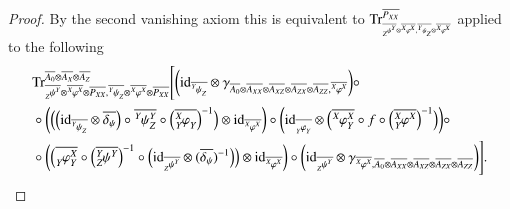 \documentclass{amsart}
\def\tn{\textnormal}
\def\Trace{\tn{Tr}}
\def\ol{\overline}
\def\id{\tn{id}}
\newcommand{\feeddd}[3]{{\tensor*[^{#2}_{\color{white}{!}}]{{#1}}{^{#3}}}}%
\newcommand{\feeddc}[3]{{\tensor*[^{#2}]{{#1}}{_{#3}}}}
\newcommand{\feedcd}[3]{{\tensor*[_{#2}]{{#1}}{^{#3}}}}
\newcommand{\feedcc}[3]{{\tensor*[^{\color{white}{!}}_{#2}]{{#1}}{_{#3}}}}
\newcommand{\feedda}[3]{{\tensor*[^{#2}_{\color{white}{!}}]{{#1}}{^{#2}_{#3}}}}
\newcommand{\feedca}[3]{{\tensor*[_{#2}]{{#1}}{_{#2}^{#3}}}}
\newcommand{\feedad}[3]{{\tensor*[^{#2}_{#3}]{{#1}}{^{#2}}}}
\newcommand{\feedac}[3]{{\tensor*[_{#2}^{#3}]{{#1}}{_{#2}}}}
\theoremstyle{remark}
\theoremstyle{definition}
\begin{document}
\begin{proof}

\newpage

By the second vanishing axiom this is equivalent to $\Trace_{_{\ol{\feedcd{\psi}{Z}{Y}}\otimes\ol{\feeddd{\varphi}{X}{X}},\ol{\feeddc{\psi}{Y}{Z}}\otimes\ol{\feeddd{\varphi}{X}{X}}}}^{\ol{P_{XX}}}$ applied to the following
\begin{align*}
&\Trace^{\ol{A_0}\otimes\ol{A_X}\otimes\ol{A_Z}}_{\ol{\feedcd{\psi}{Z}{Y}}\otimes\ol{\feeddd{\varphi}{X}{X}}\otimes\ol{P_{XX}},\ol{\feeddc{\psi}{Y}{Z}}\otimes\ol{\feeddd{\varphi}{X}{X}}\otimes\ol{P_{XX}}}\Bigg[
\bigg(\id_{\ol{\feeddc{\psi}{Y}{Z}}}\otimes\gamma_{\ol{A_0}\otimes\ol{A_{XX}}\otimes\ol{A_{XZ}}\otimes\ol{A_{ZX}}\otimes\ol{A_{ZZ}},\ol{\feeddd{\varphi}{X}{X}}}\bigg)\circ\\
&\circ\bigg(\Big(\Big(\id_{\ol{\feeddc{\psi}{Y}{Z}}}\otimes\ol{\delta_\psi}\Big)\circ\ol{\feedda{\psi}{Y}{Z}}\circ\Big(\ol{\feedac{\varphi}{Y}{X}}\Big)^{-1}\Big)\otimes\id_{\ol{\feeddd{\varphi}{X}{X}}}\bigg)\circ\bigg(\id_{\ol{\feedcc{\varphi}{Y}{Y}}}\otimes\Big(\ol{\feedda{\varphi}{X}{Y}}\circ f\circ\Big(\ol{\feedad{\varphi}{X}{Y}}\Big)^{-1}\Big)\bigg)\circ\\
&\circ\bigg(\Big(\ol{\feedca{\varphi}{Y}{X}}\circ\Big(\ol{\feedad{\psi}{Y}{Z}}\Big)^{-1}\circ\Big(\id_{\ol{\feedcd{\psi}{Z}{Y}}}\otimes(\ol{\delta_\psi})^{-1}\Big)\Big)\otimes\id_{\ol{\feeddd{\varphi}{X}{X}}}\bigg)\circ\bigg(\id_{\ol{\feedcd{\psi}{Z}{Y}}}\otimes\gamma_{\ol{\feeddd{\varphi}{X}{X}},\ol{A_0}\otimes\ol{A_{XX}}\otimes\ol{A_{XZ}}\otimes\ol{A_{ZX}}\otimes\ol{A_{ZZ}}}\bigg)\Bigg].
\end{align*}


\end{proof}
\end{document}
